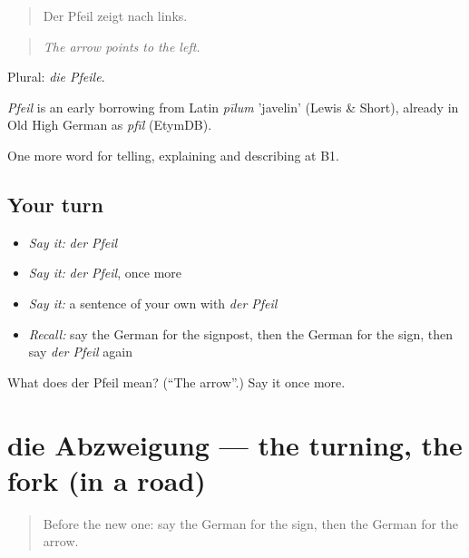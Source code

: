 \begin{quote}
Der Pfeil zeigt nach links.
\end{quote}

\begin{quote}
\emph{The arrow points to the left.}
\end{quote}

Plural: \emph{die Pfeile}.

\begin{cousinweb}
\emph{Pfeil} is an early borrowing from Latin \emph{pīlum} 'javelin' (Lewis \& Short), already in Old High German as \emph{pfīl} (EtymDB).
\end{cousinweb}

\begin{grammarlens}[title={What you've built}]
One more word for telling, explaining and describing at B1.
\end{grammarlens}

\subsection*{Your turn}
\begin{itemize}
\raggedright
  \item \emph{Say it:} \emph{der Pfeil}
  \item \emph{Say it:} \emph{der Pfeil}, once more
  \item \emph{Say it:} a sentence of your own with \emph{der Pfeil}
  \item \emph{Recall:} say the German for the signpost, then the German for the sign, then say \emph{der Pfeil} again
\end{itemize}

\begin{tcolorbox}[breakable,colback=teal!4,colframe=teal!35!black,title={Before you move on}]
What does der Pfeil mean? (\textquotedblleft{}The arrow\textquotedblright{}.) Say it once more.
\end{tcolorbox}
\section[die Abzweigung]{die Abzweigung — the turning, the fork (in a road)}

\label{lesson:GE-C434-abzweigung}



\begin{quote}
Before the new one: say the German for the sign, then the German for the arrow.
\end{quote}

